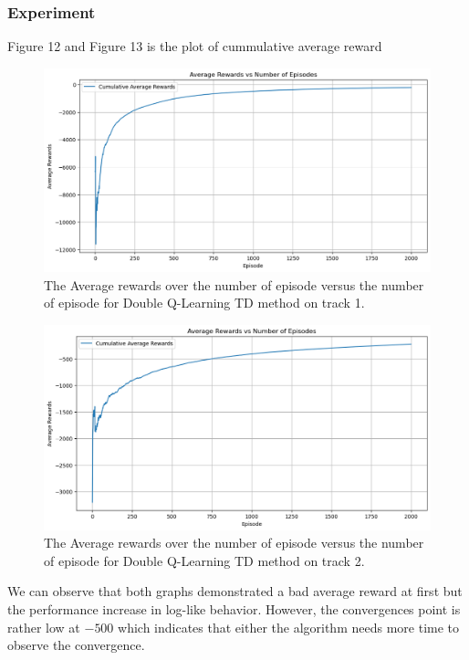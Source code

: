 \documentclass{article}
\begin{document}
\subsubsection{Experiment}
Figure 12 and Figure 13 is the plot of cummulative average reward

\begin{figure}[h!]
\centering
\includegraphics[scale=0.5]{./images/exp_q-td-ractrack1.png}
\caption{The Average rewards over the number of episode versus the number of
episode for Double Q-Learning TD method on track 1.}
\label{fig:exp_q-td-racetrack1}
\end{figure}
\begin{figure}[h!]
\centering
\includegraphics[scale=0.5]{./images/exp_q-td-racetrack2.png}
\caption{The Average rewards over the number of episode versus the number of
episode for Double Q-Learning TD method on track 2.}
\label{fig:exp_q-td-racetrack2}
\end{figure}

We can observe that both graphs demonstrated a bad average reward at first but
the performance increase in log-like behavior. However, the convergences point
is rather low at $-500$ which indicates that either the algorithm needs more
time to observe the convergence.
\end{document}
